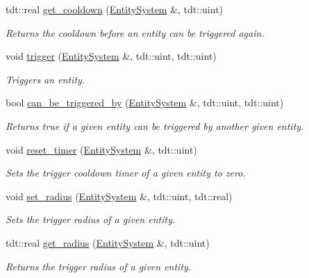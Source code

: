 \begin{DoxyCompactItemize}
tdt\+::real \hyperlink{namespace_trigger_helper_a83f5fe453bf27753c8153e752e06490a}{get\+\_\+cooldown} (\hyperlink{class_entity_system}{Entity\+System} \&, tdt\+::uint)
\begin{DoxyCompactList}\small\item\em Returns the cooldown before an entity can be triggered again. \end{DoxyCompactList}\item 
void \hyperlink{namespace_trigger_helper_a55ca1a44a7bf1dd11928c0fb4f77c8d6}{trigger} (\hyperlink{class_entity_system}{Entity\+System} \&, tdt\+::uint, tdt\+::uint)
\begin{DoxyCompactList}\small\item\em Triggers an entity. \end{DoxyCompactList}\item 
bool \hyperlink{namespace_trigger_helper_a4fda057a50d8c142cce8e111a0cf3836}{can\+\_\+be\+\_\+triggered\+\_\+by} (\hyperlink{class_entity_system}{Entity\+System} \&, tdt\+::uint, tdt\+::uint)
\begin{DoxyCompactList}\small\item\em Returns true if a given entity can be triggered by another given entity. \end{DoxyCompactList}\item 
void \hyperlink{namespace_trigger_helper_adae983dd5add9e842bc370689f119c35}{reset\+\_\+timer} (\hyperlink{class_entity_system}{Entity\+System} \&, tdt\+::uint)
\begin{DoxyCompactList}\small\item\em Sets the trigger cooldown timer of a given entity to zero. \end{DoxyCompactList}\item 
void \hyperlink{namespace_trigger_helper_a55105f8d6ee38e2b9a88266a61ada6cd}{set\+\_\+radius} (\hyperlink{class_entity_system}{Entity\+System} \&, tdt\+::uint, tdt\+::real)
\begin{DoxyCompactList}\small\item\em Sets the trigger radius of a given entity. \end{DoxyCompactList}\item 
tdt\+::real \hyperlink{namespace_trigger_helper_a565e88bea410c2de765367fda80f4191}{get\+\_\+radius} (\hyperlink{class_entity_system}{Entity\+System} \&, tdt\+::uint)
\begin{DoxyCompactList}\small\item\em Returns the trigger radius of a given entity. \end{DoxyCompactList}\end{DoxyCompactItemize}


